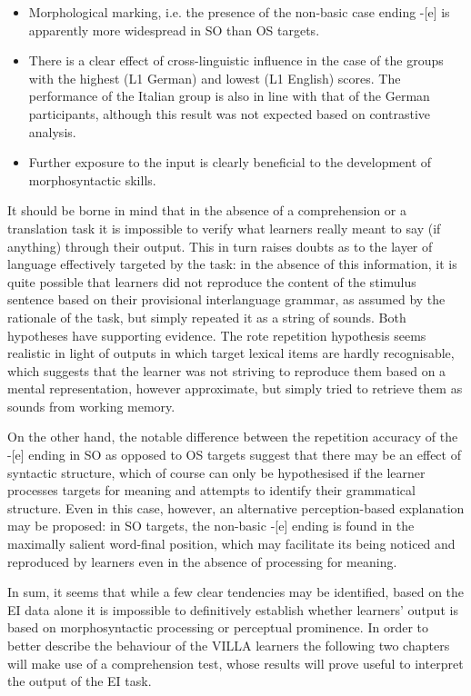 \begin{itemize}
    \item Morphological marking, i.e. the presence of the non-basic case ending -[e] is apparently more widespread in SO than OS targets.
    \item There is a clear effect of cross-linguistic influence in the case of the groups with the highest (L1 German) and lowest (L1 English) scores. The performance of the Italian group is also in line with that of the German participants, although this result was not expected based on contrastive analysis.
    \item Further exposure to the input is clearly beneficial to the development of morphosyntactic skills.
\end{itemize}

It should be borne in mind that in the absence of a comprehension or a translation task it is impossible to verify what learners really meant to say (if anything) through their output. This in turn raises doubts as to the layer of language effectively targeted by the task: in the absence of this information, it is quite possible that learners did not reproduce the content of the stimulus sentence based on their provisional interlanguage grammar, as assumed by the rationale of the task, but simply repeated it as a string of sounds. Both hypotheses have supporting evidence. The rote repetition hypothesis seems realistic in light of outputs in which target lexical items are hardly recognisable, which suggests that the learner was not striving to reproduce them based on a mental representation, however approximate, but simply tried to retrieve them as sounds from working memory.

On the other hand, the notable difference between the repetition accuracy of the -[e] ending in SO as opposed to OS targets suggest that there may be an effect of syntactic structure, which of course can only be hypothesised if the learner processes targets for meaning and attempts to identify their grammatical structure. Even in this case, however, an alternative perception-based explanation may be proposed: in SO targets, the non-basic -[e] ending is found in the maximally salient word-final position, which may facilitate its being noticed and reproduced by learners even in the absence of processing for meaning.

In sum, it seems that while a few clear tendencies may be identified, based on the EI data alone it is impossible to definitively establish whether learners' output is based on morphosyntactic processing or perceptual prominence. In order to better describe the behaviour of the VILLA learners the following two chapters will make use of a comprehension test, whose results will prove useful to interpret the output of the EI task.
